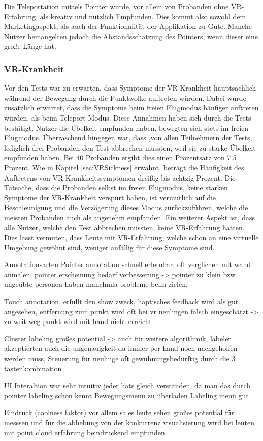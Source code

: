 Die Teleportation mittels Pointer wurde, vor allem von Probanden ohne VR-Erfahrung, als kreativ und nützlich Empfunden. Dies kommt also sowohl dem Marketingaspekt, als auch der Funktionalität der Applikation zu Gute. Manche Nutzer bemängelten jedoch die Abstandsschätzung des Pointers, wenn dieser eine große Länge hat.


\subsubsection{VR-Krankheit}

Vor den Tests war zu erwarten, dass Symptome der VR-Krankheit hauptsächlich während der Bewegung durch die Punktwolke auftreten würden. Dabei wurde zusätzlich erwartet, dass die Symptome beim freien Flugmodus häufiger auftreten würden, als beim Teleport-Modus. Diese Annahmen haben sich durch die Tests bestätigt. Nutzer die Übelkeit empfunden haben, bewegten sich stets im freien Flugmodus. Überraschend hingegen war, dass ,von allen Teilnehmern der Tests, lediglich drei Probanden den Test abbrechen mussten, weil sie zu starke Übelkeit empfunden haben. Bei 40 Probanden ergibt dies einen Prozentsatz von 7.5 Prozent. Wie in Kapitel \ref{sec:VRSickness} erwähnt, beträgt die Häufigkeit des Auftretens von VR-Krankheitssymptomen dreißig bis achtzig Prozent. Die Tatsache, dass die Probanden selbst im freien Flugmodus, keine starken Symptome der VR-Krankheit verspürt haben, ist vermutlich auf die Beschleunigung und die Verzögerung dieses Modus zurückzuführen, welche die meisten Probanden auch als angenehm empfanden. Ein weiterer Aspekt ist, dass alle Nutzer, welche den Test abbrechen mussten, keine VR-Erfahrung hatten. Dies lässt vermuten, dass Leute mit VR-Erfahrung, welche schon an eine virtuelle Umgebung gewöhnt sind, weniger anfällig für diese Symptome sind.


Annotationsarten
Pointer annotation schnell erlernbar, oft verglichen mit wand anmalen, pointer erscheinung bedarf verbesserung -> pointer zu klein bzw ungeübte personen haben manchmla probleme beim zielen.

Touch annotation, erfüllt den show zweck, haptisches feedback wird als gut angesehen, entfernung zum punkt wird oft bei vr neulingen falsch eingeschätzt -> zu weit weg punkt wird mit hand nicht erreicht

Cluster labeling
großes potential -> auch für weitere algorithmik, labeler akzeptierten auch die ungenauigkeit da immer per hand noch nachgeholfen werden muss, Steuerung für neulinge oft gewühnungsbedürftig durch die 3 tastenkombination

UI
Interaltion war sehr intuitiv jeder hats gleich verstanden, da man das durch pointer labeling schon kennt
Bewegungsmenü zu überladen
Labeling menü gut

Eindruck (coolness faktor)
vor allem sales leute sehen großes potential für messsen und für die abhebung von der konkurrenz
visualisierung wird bei leuten mit point cloud erfahrung beindruckend empfunden




